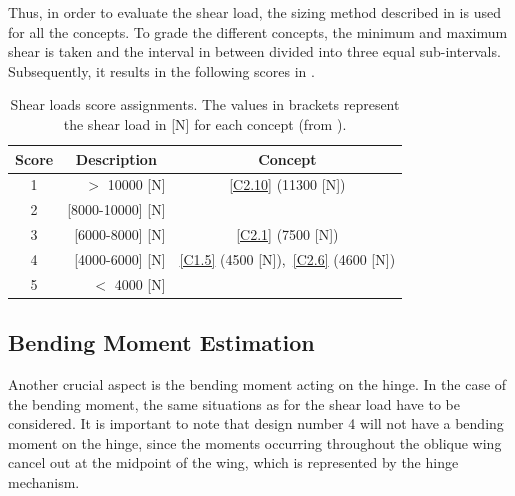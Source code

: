 Thus, in order to evaluate the shear load, the sizing method described in  is used for all the concepts.
To grade the different concepts, the minimum and maximum shear is taken and the interval in between divided into three equal sub-intervals.
Subsequently, it results in the following scores in .
\begin{table}[ht]
\centering
\caption{Shear loads score assignments. The values in brackets represent the shear load in [\unit{\N}] for each concept (from ).}
\label{tab:shear}
\begin{tabular}{c|r|c}
\toprule
  
\textbf{Score} & \multicolumn{1}{c|}{\textbf{Description}}     & \textbf{Concept} \\ \bottomrule
\rowcolor[HTML]{FD6864} 
1              & $>$ 10000 [\unit{\N}] & \ref{C2.10} (11300 [\unit{\N}])             \\
\rowcolor[HTML]{FCBF7B} 
2              & [8000-10000]     [\unit{\N}]&                  \\
\rowcolor[HTML]{E0E383} 
3              & [6000-8000] [\unit{\N}] & \ref{C2.1} (7500 [\unit{\N}])              \\
\rowcolor[HTML]{A2D07F} 
4              & [4000-6000] [\unit{\N}]   & \ref{C1.5} (4500 [\unit{\N}]),~\ref{C2.6} (4600 [\unit{\N}])   \\
\rowcolor[HTML]{63BE7B} 
5              & $<$ 4000       [\unit{\N}]      &                  \\ \toprule
\end{tabular}
\end{table}

\subsection{Bending Moment Estimation}
Another crucial aspect is the bending moment acting on the hinge.
In the case of the bending moment, the same situations as for the shear load have to be considered.
It is important to note that design number 4 will not have a bending moment on the hinge, since the moments occurring throughout the oblique wing cancel out at the midpoint of the wing, which is represented by the hinge mechanism.

